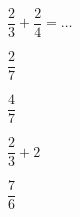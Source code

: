 \begin{QCM}
\begin{GroupeQCM}
    \begin{exercice}
      $\dfrac{2}{3} + \dfrac{2}{4} = \ldots$
      \begin{ChoixQCM}{4}
      \item $\dfrac{2}{7}$
      \item $\dfrac{4}{7}$
      \item $\dfrac{2}{3} + 2$
      \item $\dfrac{7}{6}$
      \end{ChoixQCM}
\begin{corrige}
   \end{corrige}
    \end{exercice}


\end{GroupeQCM}
\end{QCM}

  